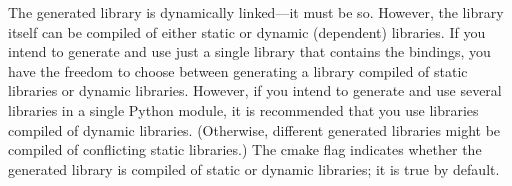 \begin{table}[!]
  \centering{}
  \caption{Module names and short names}
  \label{tab:module-name}
\end{table}

The generated library is dynamically linked---it must be so. However,
the library itself can be compiled of either static or dynamic
(dependent) libraries. If you intend to generate and use just a single
library that contains the bindings, you have the freedom to choose
between generating a library compiled of static libraries or dynamic
libraries. However, if you intend to generate and use several
libraries in a single Python module, it is recommended that you use
libraries compiled of dynamic libraries. (Otherwise, different
generated libraries might be compiled of conflicting static
libraries.) The cmake flag 
indicates whether the generated library is compiled of static or
dynamic libraries; it is true by default.

